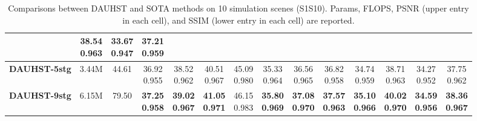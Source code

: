 \documentclass{article}
\begin{document}
\begin{table*}[t]
{\begin{tabular}{cccccccccccccc}
			&\tabincell{c}{38.54\\0.963}
			&\tabincell{c}{33.67\\0.947}
			&\tabincell{c}{37.21\\0.959}
			\\
			\midrule
\rowcolor{rouse}
			\bf DAUHST-5stg
			& 3.44M
			& 44.61
			&\tabincell{c}{36.92\\0.955}
			&\tabincell{c}{38.52\\0.962}
			&\tabincell{c}{40.51\\0.967}
			&\tabincell{c}{45.09\\0.980}
			&\tabincell{c}{35.33\\0.964}
			&\tabincell{c}{36.56\\0.965}
			&\tabincell{c}{36.82\\0.958}
			&\tabincell{c}{34.74\\0.959}
			&\tabincell{c}{38.71\\0.963}
			&\tabincell{c}{34.27\\0.952}
			&\tabincell{c}{37.75\\0.962}
			\\
			\midrule
			\rowcolor{rouse}
			\bf DAUHST-9stg
			& 6.15M
			& 79.50
			&\tabincell{c}{\bf{37.25}\\\bf{0.958}}
			&\tabincell{c}{\bf{39.02}\\\bf{0.967}}
			&\tabincell{c}{\bf{41.05}\\\bf{0.971}}
			&\tabincell{c}{{46.15}\\{0.983}}
			&\tabincell{c}{\bf{35.80}\\\bf{0.969}}
			&\tabincell{c}{\bf{37.08}\\\bf{0.970}}
			&\tabincell{c}{\bf{37.57}\\\bf{0.963}}
			&\tabincell{c}{\bf{35.10}\\\bf{0.966}}
			&\tabincell{c}{\bf{40.02}\\\bf{0.970}}
			&\tabincell{c}{\bf{34.59}\\\bf{0.956}}
			&\tabincell{c}{\bf{38.36}\\\bf{0.967}}
			\\
			\bottomrule[0.2em]
		\end{tabular}
	}
	\vspace{-1mm}
	\caption{Comparisons between DAUHST and SOTA methods on 10 simulation scenes (S1S10). Params, FLOPS, PSNR (upper entry in each cell), and SSIM (lower entry in each cell) are reported.}
	\vspace{-3mm}
	\label{tab:simu}
\end{table*}
\end{document}
